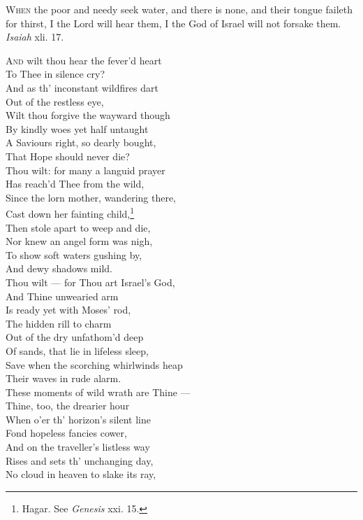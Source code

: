\textsc{When} the poor and needy seek water, and there is none, and their tongue faileth for thirst, I the Lord will hear them, I the God of Israel will not forsake them. \emph{Isaiah} xli. 17.

\textsc{And} wilt thou hear the fever’d heart \\
 To Thee in silence cry? \\
 And as th’ inconstant wildfires dart \\
 Out of the restless eye, \\
 Wilt thou forgive the wayward though \\
 By kindly woes yet half untaught \\
 A Saviours right, so dearly bought, \\
 That Hope should never die? \\
  Thou wilt: for many a languid prayer \\
 Has reach’d Thee from the wild, \\
 Since the lorn mother, wandering there, \\
 Cast down her fainting child,\footnote{Hagar. See \emph{Genesis} xxi. 15.} \\
 Then stole apart to weep and die, \\
 Nor knew an angel form was nigh, \\
 To show soft waters gushing by, \\
 And dewy shadows mild. \\
  Thou wilt — for Thou art Israel’s God, \\
 And Thine unwearied arm \\
 Is ready yet with Moses’ rod, \\
 The hidden rill to charm \\
 Out of the dry unfathom’d deep \\
 Of sands, that lie in lifeless sleep, \\
 Save when the scorching whirlwinds heap \\
 Their waves in rude alarm. \\
  These moments of wild wrath are Thine — \\
 Thine, too, the drearier hour \\
 When o’er th’ horizon’s silent line \\
 Fond hopeless fancies cower, \\
 And on the traveller’s listless way \\
 Rises and sets th’ unchanging day, \\
 No cloud in heaven to slake its ray, \\
